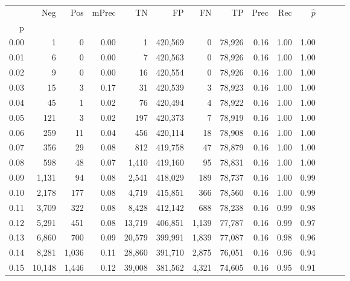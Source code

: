 \begin{tabular}{rrrrrrrrrrrrrr}
\toprule
{} &     Neg &    Pos & mPrec &       TN &       FP &      FN &      TP &  Prec &   Rec & $\hat{p}$ \\
p    &         &        &       &          &          &         &         &       &       &           \\
\midrule
0.00 &       1 &      0 &  0.00 &        1 &  420,569 &       0 &  78,926 &  0.16 &  1.00 &      1.00 \\
0.01 &       6 &      0 &  0.00 &        7 &  420,563 &       0 &  78,926 &  0.16 &  1.00 &      1.00 \\
0.02 &       9 &      0 &  0.00 &       16 &  420,554 &       0 &  78,926 &  0.16 &  1.00 &      1.00 \\
0.03 &      15 &      3 &  0.17 &       31 &  420,539 &       3 &  78,923 &  0.16 &  1.00 &      1.00 \\
0.04 &      45 &      1 &  0.02 &       76 &  420,494 &       4 &  78,922 &  0.16 &  1.00 &      1.00 \\
0.05 &     121 &      3 &  0.02 &      197 &  420,373 &       7 &  78,919 &  0.16 &  1.00 &      1.00 \\
0.06 &     259 &     11 &  0.04 &      456 &  420,114 &      18 &  78,908 &  0.16 &  1.00 &      1.00 \\
0.07 &     356 &     29 &  0.08 &      812 &  419,758 &      47 &  78,879 &  0.16 &  1.00 &      1.00 \\
0.08 &     598 &     48 &  0.07 &    1,410 &  419,160 &      95 &  78,831 &  0.16 &  1.00 &      1.00 \\
0.09 &   1,131 &     94 &  0.08 &    2,541 &  418,029 &     189 &  78,737 &  0.16 &  1.00 &      0.99 \\
0.10 &   2,178 &    177 &  0.08 &    4,719 &  415,851 &     366 &  78,560 &  0.16 &  1.00 &      0.99 \\
0.11 &   3,709 &    322 &  0.08 &    8,428 &  412,142 &     688 &  78,238 &  0.16 &  0.99 &      0.98 \\
0.12 &   5,291 &    451 &  0.08 &   13,719 &  406,851 &   1,139 &  77,787 &  0.16 &  0.99 &      0.97 \\
0.13 &   6,860 &    700 &  0.09 &   20,579 &  399,991 &   1,839 &  77,087 &  0.16 &  0.98 &      0.96 \\
0.14 &   8,281 &  1,036 &  0.11 &   28,860 &  391,710 &   2,875 &  76,051 &  0.16 &  0.96 &      0.94 \\
0.15 &  10,148 &  1,446 &  0.12 &   39,008 &  381,562 &   4,321 &  74,605 &  0.16 &  0.95 &      0.91 \\

\end{tabular}
